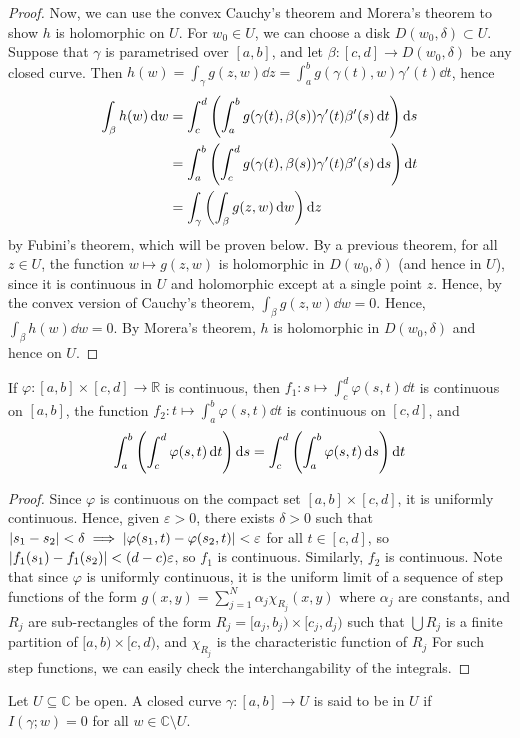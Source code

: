 \begin{proof}
	Now, we can use the convex Cauchy's theorem and Morera's theorem to show \( h \) is holomorphic on \( U \).
	For \( w_0 \in U \), we can choose a disk \( D(w_0, \delta) \subset U \).
	Suppose that \( \gamma \) is parametrised over \( [a,b] \), and let \( \beta \colon [c,d] \to D(w_0,\delta) \) be any closed curve.
	Then \( h(w) = \int_\gamma g(z,w) \dd{z} = \int_a^b g(\gamma(t),w) \gamma'(t) \dd{t} \), hence
	\begin{align*}
		\int_\beta h(w) \dd{w} &= \int_c^d \qty(\int_a^b g(\gamma(t),\beta(s))\gamma'(t)\beta'(s) \dd{t})\dd{s} \\
		&= \int_a^b \qty(\int_c^d g(\gamma(t),\beta(s))\gamma'(t)\beta'(s) \dd{s})\dd{t} \\
		&= \int_\gamma \qty(\int_\beta g(z,w) \dd{w}) \dd{z}
	\end{align*}
	by Fubini's theorem, which will be proven below.
	By a previous theorem, for all \( z \in U \), the function \( w \mapsto g(z,w) \) is holomorphic in \( D(w_0, \delta) \) (and hence in \( U \)), since it is continuous in \( U \) and holomorphic except at a single point \( z \).
	Hence, by the convex version of Cauchy's theorem, \( \int_\beta g(z,w) \dd{w} = 0 \).
	Hence, \( \int_\beta h(w) \dd{w} = 0 \).
	By Morera's theorem, \( h \) is holomorphic in \( D(w_0, \delta) \) and hence on \( U \).
\end{proof}
\begin{lemma}
	If \( \varphi \colon [a,b] \times [c,d] \to \mathbb R \) is continuous, then \( f_1 \colon s \mapsto \int_c^d \varphi(s,t) \dd{t} \) is continuous on \( [a,b] \), the function \( f_2 \colon t \mapsto \int_a^b \varphi(s,t) \dd{t} \) is continuous on \( [c,d] \), and
	\[ \int_a^b \qty( \int_c^d \varphi(s,t) \dd{t} ) \dd{s} = \int_c^d \qty( \int_a^b \varphi(s,t) \dd{s} ) \dd{t} \]
\end{lemma}
\begin{proof}
	Since \( \varphi \) is continuous on the compact set \( [a,b] \times [c,d] \), it is uniformly continuous.
	Hence, given \( \varepsilon > 0 \), there exists \( \delta > 0 \) such that \( \abs{s_1 - s_2} < \delta \implies \abs{\varphi(s_1, t) - \varphi(s_2, t)} < \varepsilon \) for all \( t \in [c,d] \), so \( \abs{f_1(s_1) - f_1(s_2)} < (d-c) \varepsilon \), so \( f_1 \) is continuous.
	Similarly, \( f_2 \) is continuous.
	Note that since \( \varphi \) is uniformly continuous, it is the uniform limit of a sequence of step functions of the form \( g(x,y) = \sum_{j=1}^N \alpha_j \chi_{R_j}(x,y) \) where \( \alpha_j \) are constants, and \( R_j \) are sub-rectangles of the form \( R_j = [a_j, b_j) \times [c_j, d_j) \) such that \( \bigcup R_j \) is a finite partition of \( [a,b) \times [c,d) \), and \( \chi_{R_j} \) is the characteristic function of \( R_j \)
	For such step functions, we can easily check the interchangability of the integrals.
\end{proof}
\begin{definition}
	Let \( U \subseteq \mathbb C \) be open.
	A closed curve \( \gamma \colon [a,b] \to U \) is said to be  in \( U \) if \( I(\gamma; w) = 0 \) for all \( w \in \mathbb C \setminus U \).
\end{definition}

